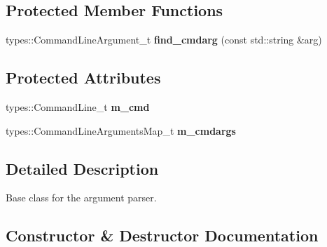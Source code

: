\subsection*{Protected Member Functions}
\begin{DoxyCompactItemize}
\item 
\mbox{\label{classcppargparse_1_1parser_1_1ArgumentParserBase_ac143815b4bf8702d88a3c25327178a45}} 
types\+::\+Command\+Line\+Argument\+\_\+t {\bfseries find\+\_\+cmdarg} (const std\+::string \&arg)
\end{DoxyCompactItemize}
\subsection*{Protected Attributes}
\begin{DoxyCompactItemize}
\item 
\mbox{\label{classcppargparse_1_1parser_1_1ArgumentParserBase_ab61aac285e831ef24598191816bed84d}} 
types\+::\+Command\+Line\+\_\+t {\bfseries m\+\_\+cmd}
\item 
\mbox{\label{classcppargparse_1_1parser_1_1ArgumentParserBase_a2024a68d8e5d71341442f35ac61d4633}} 
types\+::\+Command\+Line\+Arguments\+Map\+\_\+t {\bfseries m\+\_\+cmdargs}
\end{DoxyCompactItemize}


\subsection{Detailed Description}
Base class for the argument parser. 

\subsection{Constructor \& Destructor Documentation}
\mbox{\label{classcppargparse_1_1parser_1_1ArgumentParserBase_a1da9b21d3cb471a0c0cd816e6202b0c2}} 
